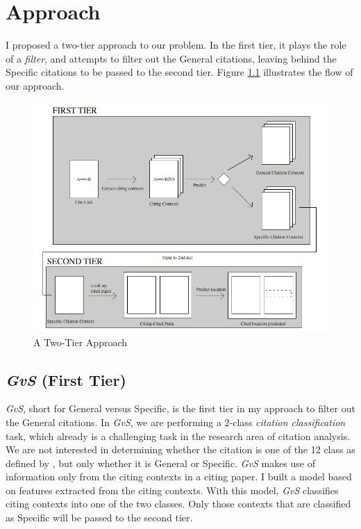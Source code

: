 \chapter{Approach}
\label{approach}
I proposed a two-tier approach to our problem. In the first tier, it plays the role of a \textit{filter}, and attempts to filter out the General citations, leaving behind the Specific citations to be passed to the second tier. Figure \ref{fig:twotier} illustrates the flow of our approach.
\begin{figure}[h]
  \centering
  \includegraphics[scale=0.60]{./twotier}
  \caption{A Two-Tier Approach}
  \label{fig:twotier}
\end{figure}

\section{{\it GvS} (First Tier)}
\label{firsttier}
{\it GvS}, short for General versus Specific, is the first tier in my approach to filter out the General citations. In {\it GvS}, we are performing a 2-class \textit{citation classification} task, which already is a challenging task in the research area of citation analysis. We are not interested in determining whether the citation is one of the 12 class as defined by \cite{teufel2009annotation}, but only whether it is General or Specific. {\it GvS} makes use of information only from the citing contexts in a citing paper. I built a model based on features extracted from the citing contexts. With this model, {\it GvS} classifies citing contexts into one of the two classes. Only those contexts that are classified as Specific will be passed to the second tier.

